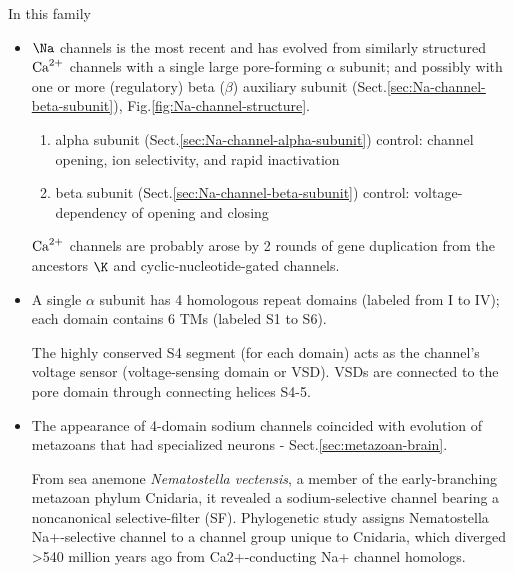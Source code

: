 In this family
\begin{itemize}
  
  \item $\Na$ channels is the most recent and has evolved from similarly
  structured ${\text{Ca}^{2+}}$ channels with a single large pore-forming $\alpha$ subunit;
  and possibly with one or more (regulatory) beta ($\beta$) auxiliary subunit
  (Sect.\ref{sec:Na-channel-beta-subunit}), Fig.\ref{fig:Na-channel-structure}.
  

\begin{enumerate}
  \item alpha subunit (Sect.\ref{sec:Na-channel-alpha-subunit}) control: channel
  opening, ion selectivity, and rapid inactivation
  
  \item beta subunit (Sect.\ref{sec:Na-channel-beta-subunit}) control:
  voltage-dependency of opening and closing
\end{enumerate}

  ${\text{Ca}^{2+}}$ channels are probably arose by 2 rounds of gene duplication from
  the ancestors $\K$ and cyclic-nucleotide-gated channels.
  
  \item A single $\alpha$ subunit has 4 homologous repeat
  domains (labeled from I to IV); each domain contains 6 TMs (labeled S1 to S6).
  
  The highly conserved S4 segment (for each domain) acts as the channel's
  voltage sensor (voltage-sensing domain or VSD). VSDs are connected to the pore
  domain through connecting helices S4-5.

  
  \item The appearance of 4-domain sodium channels coincided with evolution of
  metazoans that had specialized neurons - Sect.\ref{sec:metazoan-brain}.
  
  From sea anemone {\it Nematostella vectensis}, a member of the early-branching
  metazoan phylum Cnidaria, it revealed a sodium-selective channel bearing a
  noncanonical selective-filter (SF). Phylogenetic study assigns 
  Nematostella Na+-selective channel to a channel group unique to Cnidaria,
  which diverged >540 million years ago from Ca2+-conducting Na+ channel homologs. 
  
\end{itemize}

